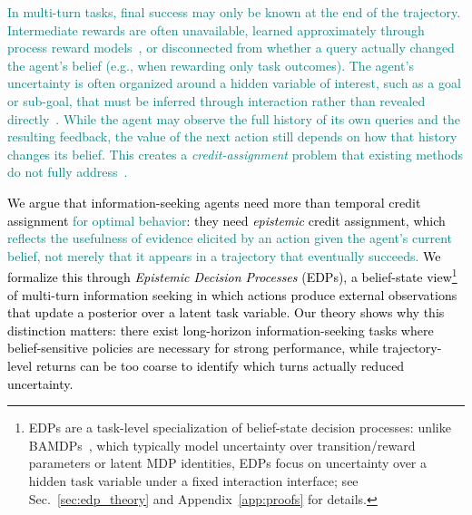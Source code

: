 \documentclass[11pt]{article}
\newcommand{\an}[1]{\textcolor{black}{#1}}
\newcommand{\nk}[1]{\textcolor{teal}{#1}}
\theoremstyle{plain}
\theoremstyle{definition}
\theoremstyle{remark}
\begin{document}
\nk{In multi-turn tasks, final success may only be known at the end of the trajectory. Intermediate rewards are often unavailable, learned approximately through process reward models~\citep{choudhury2025processrewardmodelsllm,hu2026playing20questiongame,lee2025prints}, or disconnected from whether a query actually changed the agent's belief (e.g., when rewarding only task outcomes). The agent's uncertainty is often organized around a hidden variable of interest, such as a goal or sub-goal, that must be inferred through interaction rather than revealed directly~\citep{abdulhai2023lmrl,mazzaccara-etal-2024-learning,zhang-etal-2024-probing,zhang2024the}. While the agent may observe the full history of its own queries and the resulting feedback, the value of the next action still depends on how that history changes its belief. This creates a \textit{credit-assignment} problem that existing methods do not fully address~\citep{bertolazzi2023chatgpt,laban2026llms, patil2025berkeley}.}


\an{We argue that information-seeking agents need more than temporal credit assignment \nk{for optimal behavior}: they need \textit{epistemic} credit assignment, which \nk{reflects the usefulness of evidence elicited by an action given the agent's current belief, not merely that it appears in a trajectory that eventually succeeds.}
We formalize this through \emph{Epistemic Decision Processes} (EDPs), a belief-state view\footnote{
EDPs are a task-level specialization of belief-state decision processes: unlike BAMDPs~\citep{duff2002optimal,martin1967bayesian}, which typically model uncertainty over transition/reward parameters or latent MDP identities, EDPs focus on uncertainty over a hidden task variable under a fixed interaction interface; see Sec.~\ref{sec:edp_theory} and Appendix~\ref{app:proofs} for details.
} of multi-turn information seeking in which actions produce external observations that update a posterior over a latent task variable. Our theory shows why this distinction matters: there exist long-horizon information-seeking tasks where belief-sensitive policies are necessary for strong performance, while trajectory-level returns can be too coarse to identify which turns actually reduced uncertainty.
}
\end{document}
